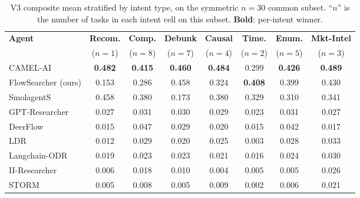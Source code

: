 \documentclass{article}
\begin{document}
\begin{table}[t]
\centering
\caption{V3 composite mean stratified by intent type, on the symmetric $n{=}30$ common subset. ``$n$'' is the number of tasks in each intent cell on this subset. \textbf{Bold}: per-intent winner.}
\label{tab:intent}
\vspace{1mm}
\footnotesize
\setlength{\tabcolsep}{4pt}
\begin{tabular}{@{}lccccccc@{}}
\toprule
\textbf{Agent} & \textbf{Recom.} & \textbf{Comp.} & \textbf{Debunk} & \textbf{Causal} & \textbf{Time.} & \textbf{Enum.} & \textbf{Mkt-Intel} \\
& ($n{=}1$) & ($n{=}8$) & ($n{=}7$) & ($n{=}4$) & ($n{=}2$) & ($n{=}5$) & ($n{=}3$) \\
\midrule
CAMEL-AI            & \textbf{0.482} & \textbf{0.415} & \textbf{0.460} & \textbf{0.484} & 0.299 & \textbf{0.426} & \textbf{0.489} \\
FlowSearcher (ours) & 0.153 & 0.286 & 0.458 & 0.324 & \textbf{0.408} & 0.399 & 0.430 \\
SmolagentS          & 0.458 & 0.380 & 0.173 & 0.380 & 0.329 & 0.310 & 0.341 \\
\cmidrule(lr){1-8}
GPT-Researcher      & 0.027 & 0.031 & 0.030 & 0.029 & 0.023 & 0.031 & 0.027 \\
DeerFlow            & 0.015 & 0.047 & 0.029 & 0.020 & 0.015 & 0.042 & 0.017 \\
LDR                 & 0.012 & 0.029 & 0.020 & 0.025 & 0.003 & 0.028 & 0.033 \\
Langchain-ODR       & 0.019 & 0.023 & 0.023 & 0.021 & 0.016 & 0.024 & 0.030 \\
II-Researcher       & 0.006 & 0.018 & 0.010 & 0.004 & 0.005 & 0.005 & 0.026 \\
STORM               & 0.005 & 0.008 & 0.005 & 0.009 & 0.002 & 0.006 & 0.021 \\
\bottomrule
\end{tabular}
\end{table}
\end{document}
